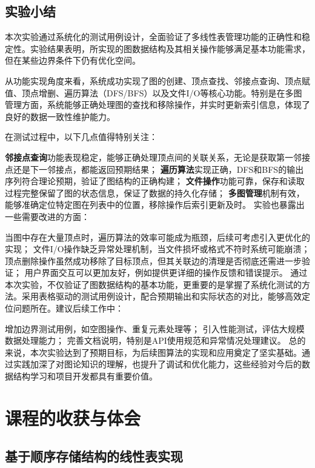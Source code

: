\documentclass[supercite]{Experimental_Report}
\theoremstyle{definition}
\begin{document}
\newpage

\subsection{实验小结}
本次实验通过系统化的测试用例设计，全面验证了多线性表管理功能的正确性和稳定性。实验结果表明，所实现的图数据结构及其相关操作能够满足基本功能需求，但在某些边界条件下仍有优化空间。

从功能实现角度来看，系统成功实现了图的创建、顶点查找、邻接点查询、顶点赋值、顶点增删、遍历算法（DFS/BFS）以及文件I/O等核心功能。特别是在多图管理方面，系统能够正确处理图的查找和移除操作，并实时更新索引信息，体现了良好的数据一致性维护能力。

在测试过程中，以下几点值得特别关注：

\textbf{邻接点查询}功能表现稳定，能够正确处理顶点间的关联关系，无论是获取第一邻接点还是下一邻接点，都能返回预期结果；
\textbf{遍历算法}实现正确，DFS和BFS的输出序列符合理论预期，验证了图结构的正确构建；
\textbf{文件操作}功能可靠，保存和读取过程完整保留了图的状态信息，保证了数据的持久化存储；
\textbf{多图管理}机制有效，能够准确定位特定图在列表中的位置，移除操作后索引更新及时。
实验也暴露出一些需要改进的方面：

当图中存在大量顶点时，遍历算法的效率可能成为瓶颈，后续可考虑引入更优化的实现；
文件I/O操作缺乏异常处理机制，当文件损坏或格式不符时系统可能崩溃；
顶点删除操作虽然成功移除了目标顶点，但其关联边的清理是否彻底还需进一步验证；
用户界面交互可以更加友好，例如提供更详细的操作反馈和错误提示。
通过本次实验，不仅验证了图数据结构的基本功能，更重要的是掌握了系统化测试的方法。采用表格驱动的测试用例设计，配合预期输出和实际状态的对比，能够高效定位问题所在。建议后续工作中：

增加边界测试用例，如空图操作、重复元素处理等；
引入性能测试，评估大规模数据处理能力；
完善文档说明，特别是API使用规范和异常情况处理建议。
总的来说，本次实验达到了预期目标，为后续图算法的实现和应用奠定了坚实基础。通过实践加深了对图论知识的理解，也提升了调试和优化能力，这些经验对今后的数据结构学习和项目开发都具有重要价值。


\newpage

\section{课程的收获与体会}

\subsection{基于顺序存储结构的线性表实现}
\end{document}
